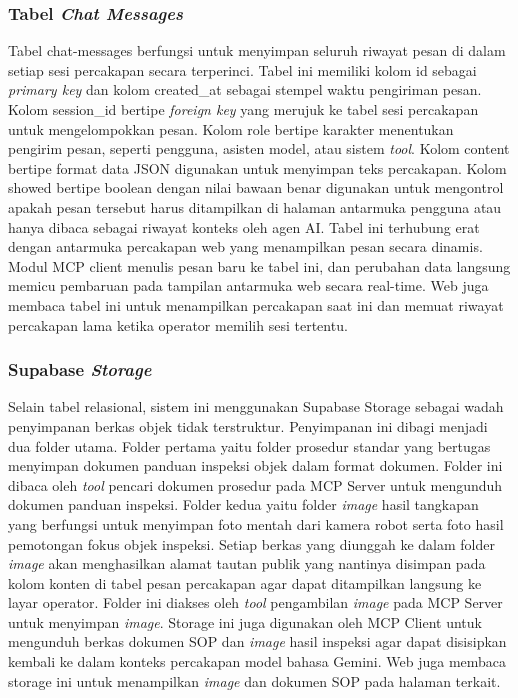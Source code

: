 \subsubsection{Tabel \textit{Chat Messages}}
Tabel chat-messages berfungsi untuk menyimpan seluruh riwayat pesan di dalam setiap sesi percakapan secara terperinci. Tabel ini memiliki kolom id sebagai \textit{primary key} dan kolom created\_at sebagai stempel waktu pengiriman pesan. Kolom session\_id bertipe \textit{foreign key} yang merujuk ke tabel sesi percakapan untuk mengelompokkan pesan. Kolom role bertipe karakter menentukan pengirim pesan, seperti pengguna, asisten model, atau sistem \textit{tool}. Kolom content bertipe format data JSON digunakan untuk menyimpan teks percakapan. Kolom showed bertipe boolean dengan nilai bawaan benar digunakan untuk mengontrol apakah pesan tersebut harus ditampilkan di halaman antarmuka pengguna atau hanya dibaca sebagai riwayat konteks oleh agen AI. Tabel ini terhubung erat dengan antarmuka percakapan web yang menampilkan pesan secara dinamis. Modul MCP client menulis pesan baru ke tabel ini, dan perubahan data langsung memicu pembaruan pada tampilan antarmuka web secara real-time. Web juga membaca tabel ini untuk menampilkan percakapan saat ini dan memuat riwayat percakapan lama ketika operator memilih sesi tertentu.

\subsubsection{Supabase \textit{Storage}}
Selain tabel relasional, sistem ini menggunakan Supabase Storage sebagai wadah penyimpanan berkas objek tidak terstruktur. Penyimpanan ini dibagi menjadi dua folder utama. Folder pertama yaitu folder prosedur standar yang bertugas menyimpan dokumen panduan inspeksi objek dalam format dokumen. Folder ini dibaca oleh \textit{tool} pencari dokumen prosedur pada MCP Server untuk mengunduh dokumen panduan inspeksi. Folder kedua yaitu folder \textit{image} hasil tangkapan yang berfungsi untuk menyimpan foto mentah dari kamera robot serta foto hasil pemotongan fokus objek inspeksi. Setiap berkas yang diunggah ke dalam folder \textit{image} akan menghasilkan alamat tautan publik yang nantinya disimpan pada kolom konten di tabel pesan percakapan agar dapat ditampilkan langsung ke layar operator. Folder ini diakses oleh \textit{tool} pengambilan \textit{image} pada MCP Server untuk menyimpan \textit{image}. Storage ini juga digunakan oleh MCP Client untuk mengunduh berkas dokumen SOP dan \textit{image} hasil inspeksi agar dapat disisipkan kembali ke dalam konteks percakapan model bahasa Gemini. Web juga membaca storage ini untuk menampilkan \textit{image} dan dokumen SOP pada halaman terkait.